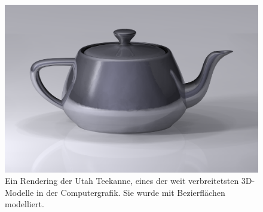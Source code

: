 \begin{figure}[H]
    \centering
    \includegraphics[scale=0.1]{images/Utah_teapot.png}
    \caption[Ein Rendering der Utah Teekanne]
            {Ein Rendering der Utah Teekanne, eines der weit verbreitetsten 
             3D-Modelle in der Computergrafik. 
             Sie wurde mit Bezierflächen modelliert.}
    \label{fig:rendering-utah-teapot}
\end{figure}


